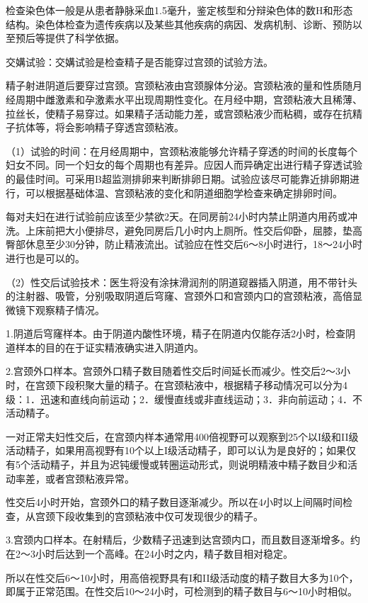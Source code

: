 \documentclass[12pt,UTF8,openany]{ctexbook}
\begin{document}
检查染色体一般是从患者静脉采血1.5毫升，鉴定核型和分辩染色体的数H和形态结构。染色体检查为遗传疾病以及某些其他疾病的病因、发病机制、诊断、预防以至预后等提供了科学依据。

交媾试验：交媾试验是检查精子是否能穿过宫颈的试验方法。

精子射进阴道后要穿过宫颈。宫颈粘液由宫颈腺体分泌。宫颈粘液的量和性质随月经周期中雌激素和孕激素水平出现周期性变化。在月经中期，宫颈粘液大且稀薄、拉丝长，使精子易穿过。如果精子活动能力差，或宫颈粘液少而粘稠，或存在抗精子抗体等，将会影响精子穿透宫颈粘液。

（1）试验的时间：在月经周期中，宫颈粘液能够允许精子穿透的时间的长度每个妇女不同。同一个妇女的每个周期也有差异。应因人而异确定出进行精子穿透试验的最佳时间。可采用B超监测排卵来判断排卵日期。试验应该尽可能靠近排卵期进行，可以根据基础体温、宫颈粘液的变化和阴道细胞学检查来确定排卵时间。

每对夫妇在进行试验前应该至少禁欲2天。在同房前24小时内禁止阴道内用药或冲洗。上床前把大小便排尽，避免同房后几小时内上厕所。性交后仰卧，屈膝，垫高臀部休息至少30分钟，防止精液流出。试验应在性交后6～8小时进行，18～24小时进行也是可以的。

（2）性交后试验技术：医生将没有涂抹滑润剂的阴道窥器插入阴道，用不带针头的注射器、吸管，分别吸取阴道后穹窿、宫颈外口和宫颈内口的宫颈粘液，高倍显微镜下观察精子情况。

1.阴道后穹窿样本。由于阴道内酸性环境，精子在阴道内仅能存活2小时，检查阴道样本的目的在于证实精液确实进入阴道内。

2.宫颈外口样本。宫颈外口精子数目随着性交后时间延长而减少。性交后2～3小时，在宫颈下段积聚大量的精子。在宫颈粘液中，根据精子移动情况可以分为4级：1．迅速和直线向前运动；2．缓慢直线或非直线运动；3．非向前运动；4．不活动精子。

一对正常夫妇性交后，在宫颈内样本通常用400倍视野可以观察到25个以I级和II级活动精子，如果用高视野有10个以上I级活动精子，即可以认为是良好的；如果仅有5个活动精子，并且为迟钝缓慢或转圈运动形式，则说明精液中精子数目少和活动率差，或者宫颈粘液异常。

性交后4小时开始，宫颈外口的精子数目逐渐减少。所以在4小时以上间隔时间检查，从宫颈下段收集到的宫颈粘液中仅可发现很少的精子。

3.宫颈内口样本。在射精后，少数精子迅速到达宫颈内口，而且数目逐渐增多。约在2～3小时后达到一个高峰。在24小时之内，精子数目相对稳定。

所以在性交后6～10小时，用高倍视野具有I和II级活动度的精子数目大多为10个，即属于正常范围。在性交后10～24小时，可检测到的精子数目与6～10小时相似。
\end{document}
